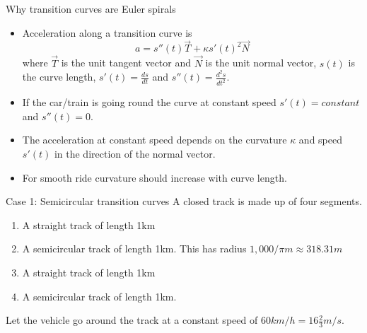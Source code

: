 \documentclass{beamer}
\begin{document}
\begin{frame}{Why transition curves are Euler spirals}
	\begin{itemize}
	\item Acceleration along a transition curve is
 	 \[
 	 a=s''(t) \vec{T}+\kappa s'(t)^2 \vec{N}
 	 \]
 	 where $\vec{T}$ is the unit tangent vector and $\vec{N}$ is the unit normal vector, $s(t)$ is the curve length, $s'(t) = \frac{ds}{dt}$ and $s''(t) = \frac{d^2 s}{dt^2}$.
 	 \item If the car/train is going round the curve at constant speed $s'(t)=constant$ and $s''(t)=0$.	
 	 \item The acceleration at constant speed depends on the curvature $\kappa$ and speed $s'(t)$ in the direction of the normal vector.
 	 \item For smooth ride curvature should increase with curve length.
	\end{itemize}
\end{frame}

\begin{frame}{Case 1: Semicircular transition curves}
	A closed  track is made up of four segments.
	\begin{enumerate}
		\item A straight track of length 1km
		\item A semicircular track of length 1km. This has radius $1,000 / \pi m \approx 318.31m$
		\item A straight track of length 1km
		\item A semicircular track of length 1km.
	\end{enumerate}
	Let the vehicle go around the track at a constant speed of $60 km/h = 16 \frac{2}{3} m/s$.
\end{frame}
\end{document}
